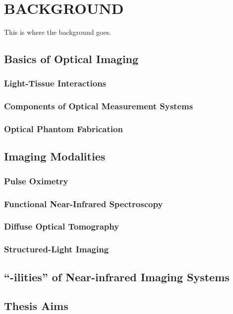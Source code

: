 
\chapter{BACKGROUND} %
\label{chap:background}
This is where the background goes. 

\section{Basics of Optical Imaging}
\label{chap:background:basics}

\subsection{Light-Tissue Interactions}
\subsection{Components of Optical Measurement Systems}
\subsection{Optical Phantom Fabrication}

\section{Imaging Modalities}
\label{chap:background:modalities}
\subsection{Pulse Oximetry}
\subsection{Functional Near-Infrared Spectroscopy}
\subsection{Diffuse Optical Tomography}
\subsection{Structured-Light Imaging}


\section{``-ilities'' of Near-infrared Imaging Systems}
\label{chap:background:ilities}


\section{Thesis Aims}
\label{chap:background:aims}



